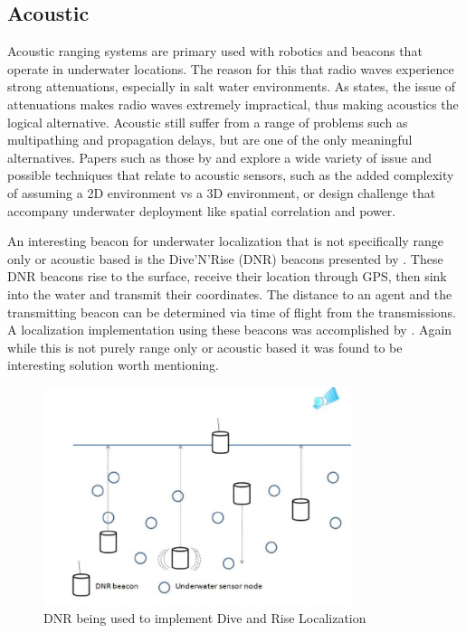 \documentclass[conference]{IEEEtran}
\begin{document}
	\subsection{Acoustic}
	
	Acoustic ranging systems are primary used with robotics and beacons that operate in underwater locations. The reason for this that radio waves experience strong attenuations, especially in salt water environments. As \cite{Partan2007} states, the issue of attenuations makes radio waves extremely impractical, thus making acoustics the logical alternative. Acoustic still suffer from a range of problems such as multipathing and propagation delays, but are one of the only meaningful alternatives. Papers such as those by \cite{Erol-Kantarci2011} and \cite{Akyildiz2005} explore a wide variety of issue and possible techniques that relate to acoustic sensors, such as the added complexity of assuming a 2D environment vs a 3D environment, or design challenge that accompany underwater deployment like spatial correlation and power. 
  	
	An interesting beacon for underwater localization that is not specifically range only or acoustic based is the Dive'N'Rise (DNR) beacons presented by \cite{Erol2007}. These DNR beacons rise to the surface, receive their location through GPS, then sink into the water and transmit their coordinates. The distance to an agent and the transmitting beacon can be determined via time of flight from the transmissions. A localization implementation using these beacons was accomplished by \cite{Erol2008}. Again while this is not purely range only or acoustic based it was found to be interesting solution worth mentioning.
	
  	\begin{figure}[h!]
	
	\centering
	
	\includegraphics[width=90mm]{DNR.png}
	
	\caption{DNR being used to implement Dive and Rise Localization  \cite{Erol-Kantarci2011}}
	
	\label{DNR}
	
\end{figure}
\end{document}
